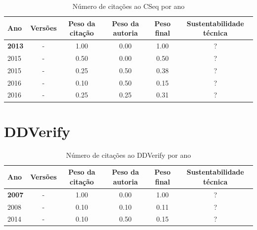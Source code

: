 \begin{table}[H]
\caption{Número de citações ao CSeq por ano}
\centering
\begin{tabular}{| l | c | c | c | c | c |}
  \hline
  Ano & Versões & Peso da citação & Peso da autoria & Peso final & Sustentabilidade técnica \\
  \hline
            {\bf 2013}
          &
          -
          &
          1.00
          &
          0.00
          &
            {\color{blue} 1.00}
          &
          ?
          \\
\hline
            2015
          &
          -
          &
          0.50
          &
          0.00
          &
            {\color{blue} 0.50}
          &
          ?
          \\
            2015
          &
          -
          &
          0.25
          &
          0.50
          &
            {\color{red} 0.38}
          &
          ?
          \\
\hline
            2016
          &
          -
          &
          0.10
          &
          0.50
          &
            {\color{red} 0.15}
          &
          ?
          \\
            2016
          &
          -
          &
          0.25
          &
          0.25
          &
            {\color{red} 0.31}
          &
          ?
          \\
\hline
\end{tabular}
\end{table}



\section{DDVerify}



\begin{table}[H]
\caption{Número de citações ao DDVerify por ano}
\centering
\begin{tabular}{| l | c | c | c | c | c |}
  \hline
  Ano & Versões & Peso da citação & Peso da autoria & Peso final & Sustentabilidade técnica \\
  \hline
            {\bf 2007}
          &
          -
          &
          1.00
          &
          0.00
          &
            {\color{blue} 1.00}
          &
          ?
          \\
\hline
            2008
          &
          -
          &
          0.10
          &
          0.10
          &
            {\color{red} 0.11}
          &
          ?
          \\
\hline
            2014
          &
          -
          &
          0.10
          &
          0.50
          &
            {\color{red} 0.15}
          &
          ?
          \\
\hline
\end{tabular}
\end{table}



